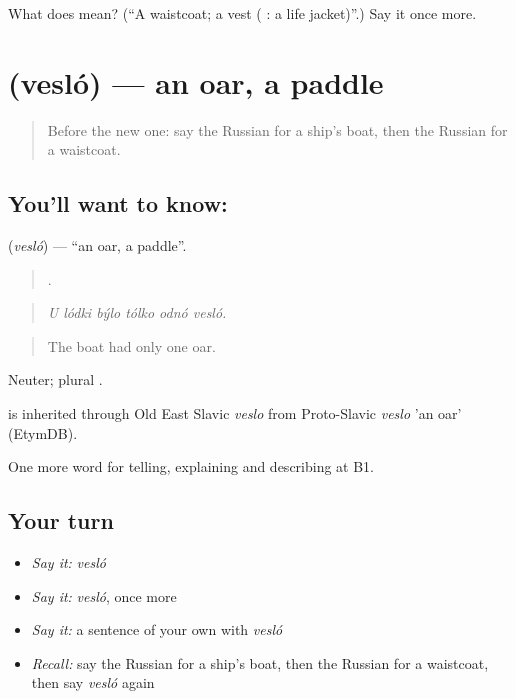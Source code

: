 \begin{tcolorbox}[breakable,colback=teal!4,colframe=teal!35!black,title={Before you move on}]
What does  mean? (\textquotedblleft{}A waistcoat; a vest ( : a life jacket)\textquotedblright{}.) Say it once more.
\end{tcolorbox}
\section[\texorpdfstring{\ru{весло} (vesló)}{весло (vesló)}]{ (vesló) — an oar, a paddle}

\label{lesson:RU-C426-veslo}



\begin{quote}
Before the new one: say the Russian for a ship's boat, then the Russian for a waistcoat.
\end{quote}

\subsection*{You'll want to know: }
\textbf{} (\emph{vesló}) — \textquotedblleft{}an oar, a paddle\textquotedblright{}.

\begin{quote}
     .
\end{quote}

\begin{quote}
\emph{U lódki býlo tólko odnó vesló.}
\end{quote}

\begin{quote}
The boat had only one oar.
\end{quote}

Neuter; plural \emph{}.

\begin{cousinweb}
\emph{} is inherited through Old East Slavic \emph{veslo} from Proto-Slavic \emph{veslo} 'an oar' (EtymDB).
\end{cousinweb}

\begin{grammarlens}[title={What you've built}]
One more word for telling, explaining and describing at B1.
\end{grammarlens}

\subsection*{Your turn}
\begin{itemize}
\raggedright
  \item \emph{Say it:} \emph{vesló}
  \item \emph{Say it:} \emph{vesló}, once more
  \item \emph{Say it:} a sentence of your own with \emph{vesló}
  \item \emph{Recall:} say the Russian for a ship's boat, then the Russian for a waistcoat, then say \emph{vesló} again
\end{itemize}

